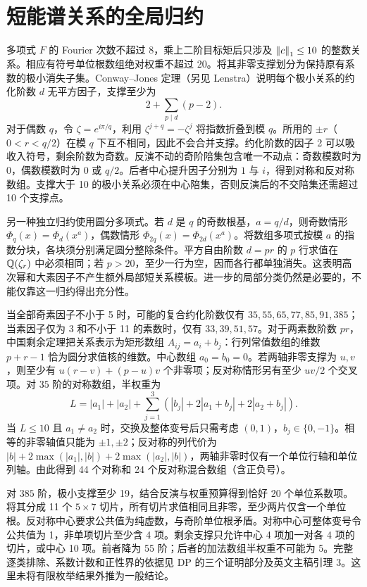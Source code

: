 \documentclass[UTF8,fontset=none,11pt]{ctexart}
\begin{document}
\section{短能谱关系的全局归约}
多项式 $F$ 的 Fourier 次数不超过 8，乘上二阶目标矩后只涉及 $\left\|c\right\|_1\le10$ 的整数关系。相应有符号单位根数组绝对权重不超过 20。将其非零支撑划分为保持原有系数的极小消失子集。Conway--Jones 定理\cite[定理5]{cj}（另见 Lenstra\cite[定理2.6]{lenstra}）说明每个极小关系的约化阶数 $d$ 无平方因子，支撑至少为
\begin{equation}2+\sum_{p\mid d}(p-2).\end{equation}
对于偶数 $q$，令 $\zeta=e^{i\pi/q}$，利用 $\zeta^{j+q}=-\zeta^j$ 将指数折叠到模 $q$。所用的 $\pm r$（$0<r<q/2$）在模 $q$ 下互不相同，因此不会合并支撑。约化阶数的因子 2 可以吸收入符号，剩余阶数为奇数。反演不动的奇阶陪集包含唯一不动点：奇数模数时为 0，偶数模数时为 0 或 $q/2$。后者中心提升因子分别为 $1$ 与 $i$，得到对称和反对称数组。支撑大于 10 的极小关系必须在中心陪集，否则反演后的不交陪集还需超过 10 个支撑点。

另一种独立归约使用圆分多项式。若 $d$ 是 $q$ 的奇数根基，$a=q/d$，则奇数情形 $\Phi_q(x)=\Phi_d(x^a)$，偶数情形 $\Phi_{2q}(x)=\Phi_{2d}(x^a)$。将数组多项式按模 $a$ 的指数分块，各块须分别满足圆分整除条件。平方自由阶数 $d=pr$ 的 $p$ 行求值在 $\mathbb Q(\zeta_r)$ 中必须相同；若 $p>20$，至少一行为空，因而各行都单独消失。这表明高次幂和大素因子不产生额外局部短关系模板。进一步的局部分类仍然是必要的，不能仅靠这一归约得出充分性。

当全部奇素因子不小于 5 时，可能的复合约化阶数仅有 $35,55,65,77,85,91,385$；当素因子仅为 3 和不小于 11 的素数时，仅有 $33,39,51,57$。对于两素数阶数 $pr$，中国剩余定理把关系表示为矩形数组 $A_{ij}=a_i+b_j$：行列常值数组的维数 $p+r-1$ 恰为圆分求值核的维数。中心数组 $a_0=b_0=0$。若两轴非零支撑为 $u,v$，则至少有 $u(r-v)+(p-u)v$ 个非零项；反对称情形另有至少 $uv/2$ 个交叉项。对 $35$ 阶的对称数组，半权重为
\[L=|a_1|+|a_2|+\sum_{j=1}^3(|b_j|+2|a_1+b_j|+2|a_2+b_j|).\]
当 $L\le10$ 且 $a_1\ne a_2$ 时，交换及整体变号后只需考虑 $(0,1)$，$b_j\in\{0,-1\}$。相等的非零轴值只能为 $\pm1,\pm2$；反对称的列代价为 $|b|+2\max(|a_1|,|b|)+2\max(|a_2|,|b|)$，两轴非零时仅有一个单位行轴和单位列轴。由此得到 44 个对称和 24 个反对称混合数组（含正负号）。

对 $385$ 阶，极小支撑至少 19，结合反演与权重预算得到恰好 20 个单位系数项。将其分成 11 个 $5\times7$ 切片，所有切片求值相同且非零，至少两片仅含一个单位根。反对称中心要求公共值为纯虚数，与奇阶单位根矛盾。对称中心可整体变号令公共值为 1，非单项切片至少含 4 项。剩余支撑只允许中心 4 项加一对各 4 项的切片，或中心 10 项。前者降为 55 阶；后者的加法数组半权重不可能为 5。完整逐类排除、系数计数和正性界的依据见 DP 的三个证明部分及英文主稿引理 3。这里未将有限枚举结果外推为一般结论。
\end{document}
